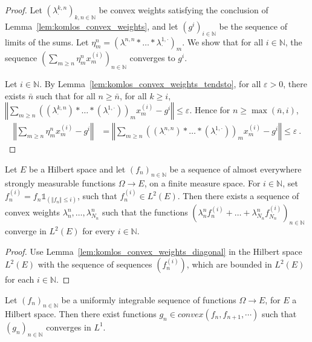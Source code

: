 \begin{proof}
  \leanok
Let $(\lambda^{k,n}_\cdot)_{k, n \in \mathbb{N}}$ be convex weights satisfying the conclusion of Lemma~\ref{lem:komlos_convex_weights}, and let $(g^i)_{i\in \mathbb{N}}$ be the sequence of limits of the sums.
Let $\eta^n_m = (\lambda^{n,n}_\cdot * \ldots * \lambda^{1,\cdot}_\cdot)_m$.
We show that for all $i \in \mathbb{N}$, the sequence $\left(\sum_{m \ge n} \eta^n_m x_m^{(i)}\right)_{n \in \mathbb{N}}$ converges to $g^i$.

Let $i \in \mathbb{N}$.
By Lemma~\ref{lem:komlos_convex_weights_tendsto}, for all $\varepsilon > 0$, there exists $\bar{n}$ such that for all $n \ge \bar{n}$, for all $k \ge i$, $\left\Vert\sum_{m \ge n} \left((\lambda^{k,n}_\cdot) * \ldots * (\lambda^{1,\cdot}_\cdot)\right)_m x_m^{(i)} - g^i\right\Vert \le \varepsilon$.
Hence for $n \ge \max(\bar{n}, i)$,
\begin{align*}
  \left\Vert\sum_{m \ge n} \eta^n_m x_m^{(i)} - g^i\right\Vert
  &= \left\Vert\sum_{m \ge n} \left((\lambda^{n,n}_\cdot) * \ldots * (\lambda^{1,\cdot}_\cdot)\right)_m x_m^{(i)} - g^i\right\Vert
  \le \varepsilon
  \: .
\end{align*}
\end{proof}


\begin{lemma}\label{lem:komlos_convex_aux}
  \leanok
Let $E$ be a Hilbert space and let $(f_n)_{n \in \mathbb{N}}$ be a sequence of almost everywhere strongly measurable functions $\Omega \to E$, on a finite measure space.
For $i \in \mathbb{N}$, set $f_n^{(i)} = f_n \mathbb{1}_{(\Vert f_n \Vert \le i)}$, such that $f_n^{(i)} \in L^2(E)$.
Then there exists a sequence of convex weights $\lambda_n^{n}, \ldots, \lambda_{N_n}^{n}$ such that the functions
$\left(\lambda_n^{n} f_n^{(i)} + \ldots + \lambda_{N_n}^{n} f_{N_n}^{(i)} \right)_{n\in\mathbb{N}}$
converge in $L^2(E)$ for every $i \in \mathbb{N}$.
\end{lemma}

\begin{proof}
  \leanok
Use Lemma~\ref{lem:komlos_convex_weights_diagonal} in the Hilbert space $L^2(E)$ with the sequence of sequences $(f_n^{(i)})$, which are bounded in $L^2(E)$ for each $i \in \mathbb{N}$.
\end{proof}


\begin{lemma}\label{lem:komlos}
  \leanok
Let $(f_n)_{n\in\mathbb{N}}$ be a uniformly integrable sequence of functions $\Omega \to E$, for $E$ a Hilbert space.
Then there exist functions $g_n \in convex(f_n, f_{n+1}, \cdots)$ such that $(g_n)_{n\in\mathbb{N}}$ converges in $L^1$.
\end{lemma}

